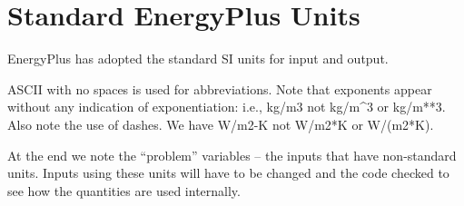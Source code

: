 \chapter{Standard EnergyPlus Units}\label{standard-energyplus-units}

EnergyPlus has adopted the standard SI units for input and output.

ASCII with no spaces is used for abbreviations. Note that exponents appear without any indication of exponentiation: i.e., kg/m3 not kg/m\^{}3 or kg/m**3. Also note the use of dashes. We have W/m2-K not W/m2*K or W/(m2*K).

At the end we note the ``problem'' variables -- the inputs that have non-standard units. Inputs using these units will have to be changed and the code checked to see how the quantities are used internally.

